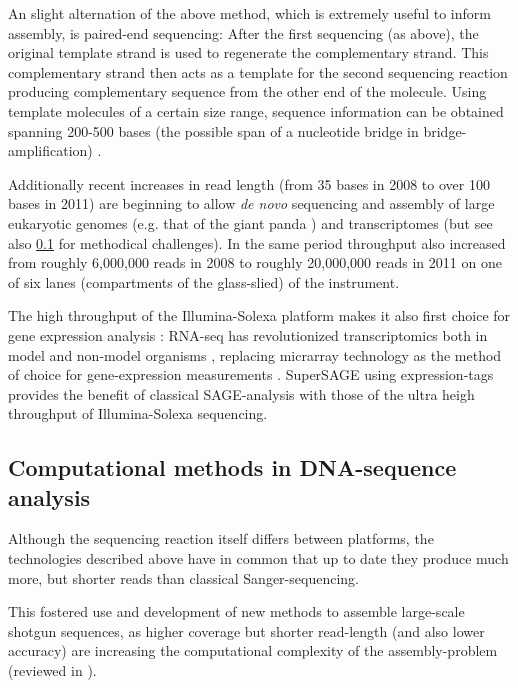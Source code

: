 An slight alternation of the above method, which is extremely useful
to inform assembly, is paired-end sequencing: After the first
sequencing (as above), the original template strand is used to
regenerate the complementary strand. This complementary strand then
acts as a template for the second sequencing reaction producing
complementary sequence from the other end of the molecule. Using
template molecules of a certain size range, sequence information can
be obtained spanning 200-500 bases (the possible span of a nucleotide
bridge in bridge-amplification) \cite{pmid18987734}.

Additionally recent increases in read length (from 35 bases in 2008 to
over 100 bases in 2011) are beginning to allow \textit{de novo}
sequencing and assembly of large eukaryotic genomes (e.g. that of the
giant panda \cite{pmid20010809}) and transcriptomes
\cite{pmid21679424} (but see also \ref{sec:comp-meth-dna} for
methodical challenges). In the same period throughput also increased
from roughly 6,000,000 reads in 2008 to roughly 20,000,000 reads in
2011 on one of six lanes (compartments of the glass-slied) of the
instrument.

The high throughput of the Illumina-Solexa platform makes it also
first choice for gene expression analysis \cite{pmid21627854}: RNA-seq
has revolutionized transcriptomics both in model and non-model
organisms \cite{pmid19015660}, replacing micrarray technology as the
method of choice for gene-expression measurements \cite{pmid18927111}.
SuperSAGE \cite{pmid20967605} using expression-tags provides the
benefit of classical SAGE-analysis \cite{pmid7570003} with those of
the ultra heigh throughput of Illumina-Solexa sequencing.

\subsection{Computational methods in DNA-sequence analysis}
\label{sec:comp-meth-dna}

Although the sequencing reaction itself differs between platforms, the
technologies described above have in common that up to date they
produce much more, but shorter reads than classical Sanger-sequencing.

This fostered use and development of new methods to assemble
large-scale shotgun sequences, as higher coverage but shorter
read-length (and also lower accuracy) are increasing the computational
complexity of the assembly-problem (reviewed in \cite{pmid20211242}).

